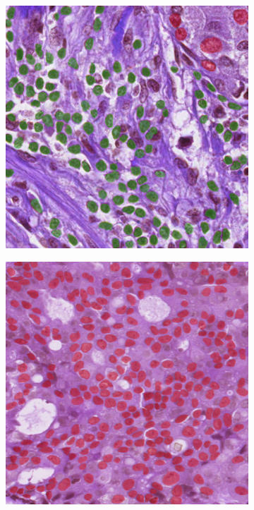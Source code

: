 \begin{figure}[H]
    \centering
    \begin{subfigure}[b]{0.3\textwidth}
    \includegraphics[width=\textwidth]{imgs/qual/monusac/gt1.overlay.png}
    \label{fig:monusac-gt1}
  \end{subfigure}
  \begin{subfigure}[b]{0.3\textwidth}
    \includegraphics[width=\textwidth]{imgs/qual/monusac/gt2.overlay.png}

\end{subfigure}
\end{figure}
